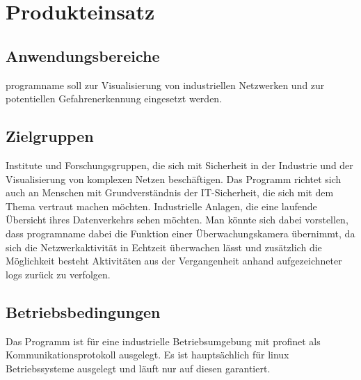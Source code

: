 \chapter{Produkteinsatz}

\section{Anwendungsbereiche}
\gls{programname} soll zur Visualisierung von industriellen Netzwerken und zur potentiellen Gefahrenerkennung eingesetzt werden.

\section{Zielgruppen}
Institute und Forschungsgruppen, die sich mit Sicherheit in der Industrie und der Visualisierung von komplexen Netzen beschäftigen. Das Programm richtet sich auch an Menschen mit Grundverständnis der IT-Sicherheit, die sich mit dem Thema vertraut machen möchten.\newline\newline
Industrielle Anlagen, die eine laufende Übersicht ihres Datenverkehrs sehen möchten. Man könnte sich dabei vorstellen, dass \gls{programname} dabei die Funktion einer Überwachungskamera übernimmt, da sich die Netzwerkaktivität in Echtzeit überwachen lässt und zusätzlich die Möglichkeit besteht Aktivitäten aus der Vergangenheit anhand aufgezeichneter \glspl{log} zurück zu verfolgen.

\section{Betriebsbedingungen}
Das Programm ist für eine industrielle Betriebsumgebung mit \gls{profinet} als Kommunikationsprotokoll ausgelegt. Es ist hauptsächlich für \gls{linux} Betriebssysteme ausgelegt und läuft nur auf diesen garantiert.
